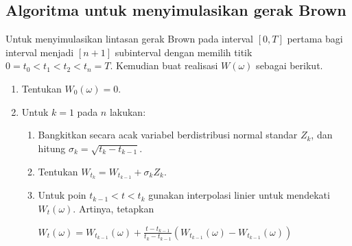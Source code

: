 \documentclass[a4paper,12pt]{article}
\theoremstyle{definition}
\begin{document}
\subsection{Algoritma untuk menyimulasikan gerak Brown}
Untuk menyimulasikan lintasan gerak Brown pada interval $[0, T]$ pertama bagi interval menjadi $[n+1]$ subinterval dengan memilih titik $0 = t_0 < t_1 < t_2 < t_n = T$. Kemudian buat realisasi $W(\omega)$ sebagai berikut.
\begin{enumerate}
    \item Tentukan $W_0(\omega)=0$.
    \item Untuk $k=1$ pada $n$ lakukan:
        \begin{enumerate}
            \item Bangkitkan secara acak variabel berdistribusi normal standar $Z_k$, dan hitung $\sigma _k=\sqrt{t_k-t_{k-1}}$.
            \item Tentukan $W_{t_{k}}=W_{t_{k-1}}+\sigma _k Z_k$.
            \item Untuk poin $t_{k-1} < t < t_k$ gunakan interpolasi linier untuk mendekati $W_t(\omega)$. Artinya, tetapkan
            
                $W_t(\omega)=W_{t_{k-1}}(\omega)+\frac{t-t_{k-1}}{t_k-t_{k-1}}(W_{t_{k-1}}(\omega)-W_{t_{k-1}}(\omega))$
        \end{enumerate}
\end{enumerate}
\end{document}
